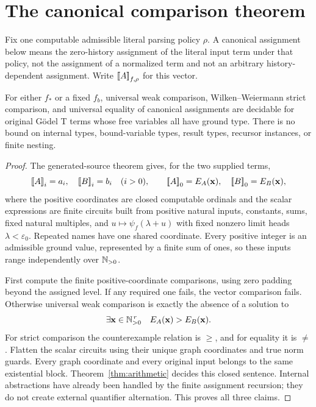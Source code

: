 \section{The canonical comparison theorem}\label{sec:consequences}

Fix one computable admissible literal parsing policy \(\rho\). A
canonical assignment below means the zero-history assignment of the
literal input term under that policy, not the assignment of a normalized
term and not an arbitrary history-dependent assignment. Write
\(\mathopen{[\![}A\mathclose{]\!]}_{f,\rho}\) for this vector.

\begin{theorem}\label{thm:ground}
For either \(f_*\) or a fixed \(f_b\), universal weak comparison,
Wilken--Weiermann strict comparison, and universal equality of canonical
assignments are decidable for original G\"odel T terms whose free variables
all have ground type. There is no bound on internal types, bound-variable
types, result types, recursor instances, or finite nesting.
\end{theorem}
\begin{proof}
The generated-source theorem gives, for the two supplied terms,
\[
 \can A_i=a_i,\quad\can B_i=b_i\quad(i>0),\qquad
 \can A_0=E_A(\mathbf x),\quad\can B_0=E_B(\mathbf x),
\]
where the positive coordinates are closed computable ordinals and the
scalar expressions are finite circuits built from positive natural inputs,
constants, sums, fixed natural multiples, and
\(u\mapsto\psi_f(\lambda+u)\) with fixed nonzero limit heads
\(\lambda<\varepsilon_0\). Repeated names have one shared coordinate.
Every positive integer is an admissible ground value, represented by a
finite sum of ones, so these inputs range independently over
\(\mathbb N_{>0}\).

First compute the finite positive-coordinate comparisons, using zero
padding beyond the assigned level. If any required one fails, the
vector comparison fails. Otherwise universal weak comparison is exactly
the absence of a solution to
\[
 \exists\mathbf x\in\mathbb N_{>0}^{\,r}\quad E_A(\mathbf x)>E_B(\mathbf x).
\]
For strict comparison the counterexample relation is \(\ge\), and
for equality it is \(\ne\). Flatten the scalar circuits using their
unique graph coordinates and true norm guards. Every graph coordinate
and every original input belongs to the same existential block.
Theorem~\ref{thm:arithmetic} decides this closed sentence. Internal
abstractions have already been handled by the finite assignment recursion;
they do not create external quantifier alternation. This proves all
three claims.
\end{proof}

